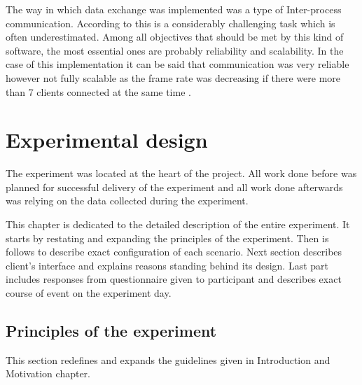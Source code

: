 \documentclass[11pt,english]{article}
\begin{document}
\par

The way in which data exchange was implemented was a type of Inter-process communication. According to \citet{rajkumar1995real} this is a considerably challenging task which is often underestimated. Among all objectives that should be met by this kind of  software, the most essential ones are probably reliability and scalability. In the case of this implementation it can be said that communication was very reliable however not fully scalable as the frame rate was decreasing if there were more than 7 clients connected at the same time \citep{rajkumar1995real}.


\section{Experimental design}


The experiment was located at the heart of the project. All work done before was planned for successful delivery of the experiment and all work done afterwards was relying on the data collected during the experiment. 

\par

This chapter is dedicated to the detailed description of the entire experiment. It starts by restating and expanding the principles of the experiment. Then is follows to describe exact configuration of each scenario. Next section describes client's interface and explains reasons standing behind its design. Last part includes responses from questionnaire given to participant and describes exact course of event on the experiment day. 

\par



\subsection{Principles of the experiment}

This section redefines and expands the guidelines given in Introduction and Motivation chapter.  
\end{document}
